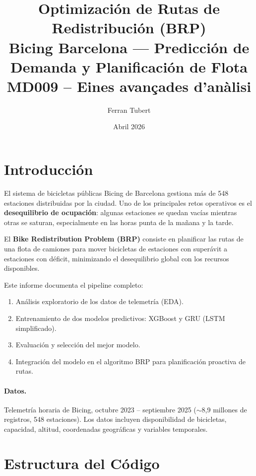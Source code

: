 \documentclass[12pt,a4paper]{article}
\title{
  \vspace{-1cm}
  {\Large Optimización de Rutas de Redistribución (BRP)} \\[6pt]
  {\large Bicing Barcelona --- Predicción de Demanda y Planificación de Flota} \\[4pt]
  {\normalsize MD009 -- Eines avançades d'anàlisi}
}
\author{Ferran Tubert}
\date{Abril 2026}
\begin{document}
\maketitle
\thispagestyle{fancy}
\tableofcontents
\newpage

\section{Introducción}

El sistema de bicicletas públicas Bicing de Barcelona gestiona más de 548 estaciones
distribuidas por la ciudad. Uno de los principales retos operativos es el
\textbf{desequilibrio de ocupación}: algunas estaciones se quedan vacías mientras otras
se saturan, especialmente en las horas punta de la mañana y la tarde.

El \textbf{Bike Redistribution Problem (BRP)} consiste en planificar las rutas de una
flota de camiones para mover bicicletas de estaciones con superávit a estaciones con
déficit, minimizando el desequilibrio global con los recursos disponibles.

Este informe documenta el pipeline completo:
\begin{enumerate}
  \item Análisis exploratorio de los datos de telemetría (EDA).
  \item Entrenamiento de dos modelos predictivos: XGBoost y GRU (LSTM simplificado).
  \item Evaluación y selección del mejor modelo.
  \item Integración del modelo en el algoritmo BRP para planificación proactiva de rutas.
\end{enumerate}

\paragraph{Datos.}
Telemetría horaria de Bicing, octubre 2023 -- septiembre 2025 ($\sim$8,9 millones de
registros, 548 estaciones). Los datos incluyen disponibilidad de bicicletas,
capacidad, altitud, coordenadas geográficas y variables temporales.

\section{Estructura del Código}
\end{document}
